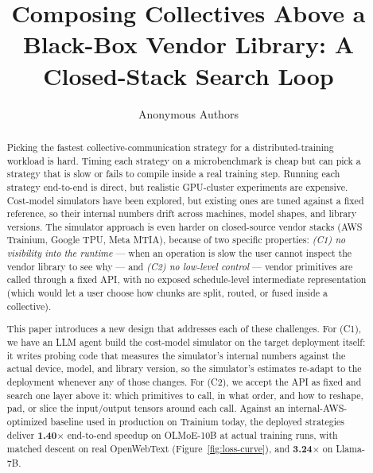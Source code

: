 \documentclass[sigplan,10pt,nonacm,anonymous]{acmart}
\begin{document}
\title{Composing Collectives Above a Black-Box Vendor Library:
A Closed-Stack Search Loop}
\author{Anonymous Authors}
\renewcommand{\shortauthors}{Anonymous}
\makeatletter
{}
\makeatother

\begin{abstract}
Picking the fastest collective-communication strategy for a
distributed-training workload is hard. Timing each strategy on
a microbenchmark is cheap but can pick a strategy that is slow or
fails to compile inside a real training step. Running each
strategy end-to-end is direct, but realistic GPU-cluster
experiments are expensive. Cost-model simulators have been
explored, but existing ones are tuned against a fixed reference,
so their internal numbers drift across machines, model shapes,
and library versions. The simulator approach is even harder on
closed-source vendor stacks (AWS Trainium, Google TPU, Meta
MTIA), because of two specific properties: \emph{(C1) no
visibility into the runtime} --- when an operation is slow the
user cannot inspect the vendor library to see why --- and
\emph{(C2) no low-level control} --- vendor primitives are
called through a fixed API, with no exposed schedule-level
intermediate representation (which would let a user choose how
chunks are split, routed, or fused inside a collective).

This paper introduces a new design that addresses each of these
challenges. For (C1), we have an LLM agent build the cost-model
simulator on the target deployment itself: it writes probing
code that measures the simulator's internal numbers against the
actual device, model, and library version, so the simulator's
estimates re-adapt to the deployment whenever any of those
changes. For (C2), we accept the API as fixed and search one
layer above it: which primitives to call, in what order, and
how to reshape, pad, or slice the input/output tensors around
each call. Against an internal-AWS-optimized baseline used in
production on Trainium today, the deployed strategies deliver
\textbf{1.40$\times$} end-to-end speedup on OLMoE-10B at actual
training runs, with matched descent on real OpenWebText
(Figure~\ref{fig:loss-curve}), and \textbf{3.24$\times$} on
Llama-7B.
\end{abstract}
\end{document}
